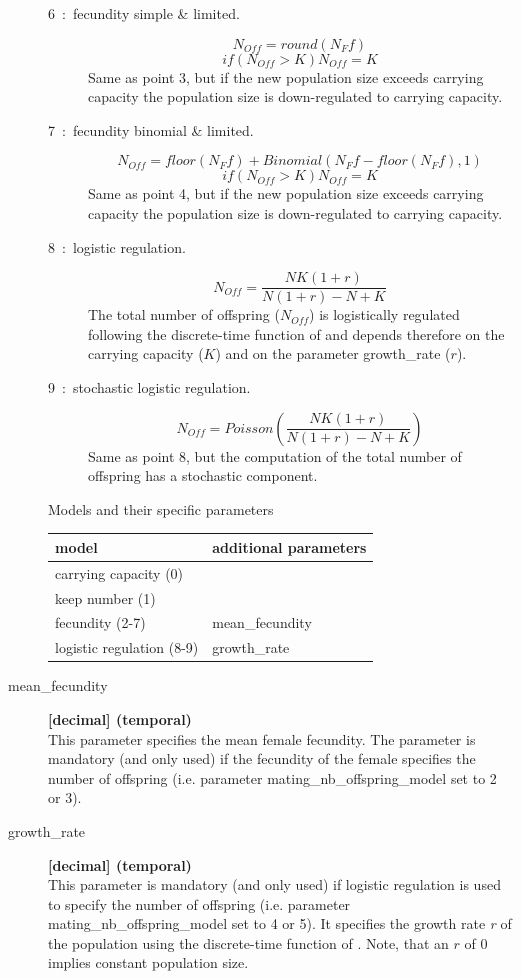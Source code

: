 \documentclass[letterpaper,12pt,oneside]{book}
\begin{document}
\begin{description}
\begin{description}
\item [6~:~fecundity simple \& limited.]
\[ N_{Off}=round(N_{F}f) \]
\[ if(N_{Off}>K) N_{Off}=K \]
Same as point 3, but if the new population size exceeds carrying capacity the population size is down-regulated to carrying capacity.
\item [7~:~fecundity binomial \& limited.]
\[ N_{Off}=floor(N_{F}f)+Binomial(N_{F}f-floor(N_{F}f),1) \]
\[ if(N_{Off}>K) N_{Off}=K \]
Same as point 4, but if the new population size exceeds carrying capacity the population size is down-regulated to carrying capacity.
\item [8~:~logistic regulation.] \[ N_{Off} = \frac{NK(1+r)}{N(1+r)-N+K} \]
The total number of offspring ($N_{Off}$) is logistically regulated following the discrete-time function of \citet{Beverton_1957} and depends therefore on the carrying capacity ($K$) and on the parameter \textsf{growth\_rate} ($r$). 
\item [9~:~stochastic logistic regulation.] \[ N_{Off} = Poisson(\frac{NK(1+r)}{N(1+r)-N+K}) \] 
Same as point 8, but the computation of the total number of offspring has a stochastic component.
\end{description}

Models and their specific parameters\\
\begin{tabular*}{0.92\textwidth}{ll}
 \hline model                        & additional parameters \\ 
 \hline
 carrying capacity (0)               & \\
 keep number (1)                     & \\
 fecundity (2-7)                     & mean\_fecundity\\
 logistic regulation (8-9)           & growth\_rate\\
 \hline
\end{tabular*}

\item[mean\_fecundity\index{mean\_fecundity}] \textbf{[decimal] (temporal)}\\
This parameter specifies the mean female fecundity. The parameter is mandatory (and only used) if the fecundity of the female specifies the number of offspring (i.e. parameter \textsf{mating\_nb\_offspring\_model} set to 2 or 3).

\item[growth\_rate\index{growth\_rate}] \textbf{[decimal] (temporal)}\\
This parameter is mandatory (and only used) if logistic regulation is used to specify the number of offspring (i.e. parameter \textsf{mating\_nb\_offspring\_model} set to 4 or 5). It specifies the growth rate \textit{r} of the population using the discrete-time function of \citet{Beverton_1957}. Note, that an $r$ of 0 implies constant population size.



\end{description}
\end{document}
